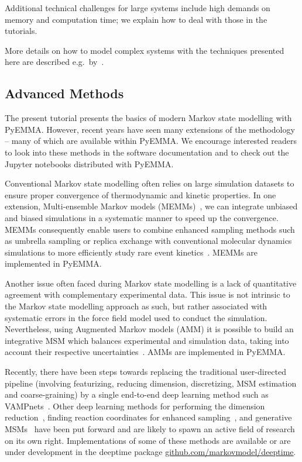 \documentclass[9pt,tutorial]{livecoms}
\begin{document}
Additional technical challenges for large systems include high demands on memory and computation time; we explain how to deal with those in the tutorials.

More details on how to model complex systems with the techniques presented here are described e.g.~by~\cite{plattner_protein_2015,plattner_complete_2017}.

\subsection{Advanced Methods}

The present tutorial presents the basics of modern Markov state modelling with PyEMMA. However, recent years have seen many extensions of the methodology -- many of which are available within PyEMMA. We encourage interested readers to look into these methods in the software documentation and to check out the Jupyter notebooks distributed with PyEMMA.

Conventional Markov state modelling often relies on large simulation datasets to ensure proper convergence of thermodynamic and kinetic properties. In one extension, Multi-ensemble Markov models (MEMMs)~\cite{dtram,tram}, we can integrate unbiased and biased simulations in a systematic manner to speed up the convergence. MEMMs consequently enable users to combine enhanced sampling methods such as umbrella sampling or replica exchange with conventional molecular dynamics simulations to more efficiently study rare event kinetics~\cite{trammbar}. MEMMs are implemented in PyEMMA.

Another issue often faced during Markov state modelling is a lack of quantitative agreement with complementary experimental data. This issue is not intrinsic to the Markov state modelling approach as such, but rather associated with systematic errors in the force field model used to conduct the simulation. Nevertheless, using Augmented Markov models (AMM) it is possible to build an integrative MSM which balances experimental and simulation data, taking into account their respective uncertainties~\cite{simon-amm}. AMMs are implemented in PyEMMA.  

Recently, there have been steps towards replacing the traditional user-directed pipeline (involving featurizing, reducing dimension, discretizing, MSM estimation and coarse-graining) by a single end-to-end deep learning method such as VAMPnets~\cite{vampnet}.
Other deep learning methods for performing the dimension reduction~\cite{tae}, finding reaction coordinates for enhanced sampling~\cite{hernandez-vde,Sultan2018-vde-enhanced-sampling,Ribeiro2018-rave}, and generative MSMs~\cite{deep-gen-msm-preprint} have been put forward and are likely to spawn an active field of research on its own right.
Implementations of some of these methods are available or are under development in the deeptime package \url{github.com/markovmodel/deeptime}. 
\end{document}
